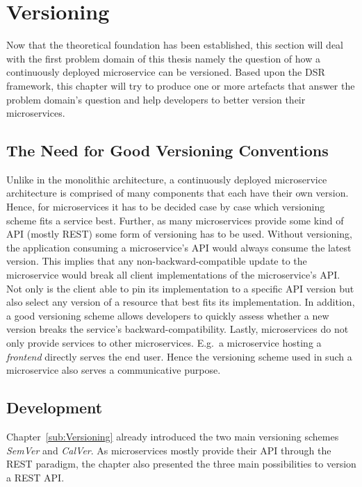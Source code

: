 
\section{Versioning}%
\label{sec:Versioning}

Now that the theoretical foundation has been established, this section will
deal with the first problem domain of this thesis namely the question of how a
continuously deployed microservice can be versioned. Based upon the \ac{DSR}
framework, this chapter will try to produce one or more artefacts that answer
the problem domain's question and help developers to better version their
microservices.

\subsection{The Need for Good Versioning Conventions}%
\label{sub:The_Need_for_Good_Versioning_Conventions}
Unlike in the monolithic architecture, a continuously deployed microservice
architecture is comprised of many components that each have their own version.
Hence, for microservices it has to be decided case by case which versioning
scheme fits a service best. Further, as many microservices provide some kind of
\ac{API} (mostly \ac{REST}) some form of versioning has to be used. Without
versioning, the application consuming a microservice's \ac{API} would always
consume the latest version. This implies that any non-backward-compatible
update to the microservice would break all client implementations of the
microservice's \ac{API}. Not only is the client able to pin its implementation
to a specific \ac{API} version but also select any version of a resource that
best fits its implementation. In addition, a good versioning scheme allows
developers to quickly assess whether a new version breaks the service's
backward-compatibility. Lastly, microservices do not only provide services to
other microservices. E.g.\ a microservice hosting a \textit{frontend} directly
serves the end user. Hence the versioning scheme used in such a microservice
also serves a communicative purpose.

\subsection{Development}%
\label{sub:Successfully_Implementing_Versioning}
Chapter~\ref{sub:Versioning} already introduced the two main versioning schemes
\textit{SemVer} and \textit{CalVer}. As microservices mostly provide their
\ac{API} through the \ac{REST} paradigm, the chapter also presented the three
main possibilities to version a \ac{REST} \ac{API}.

